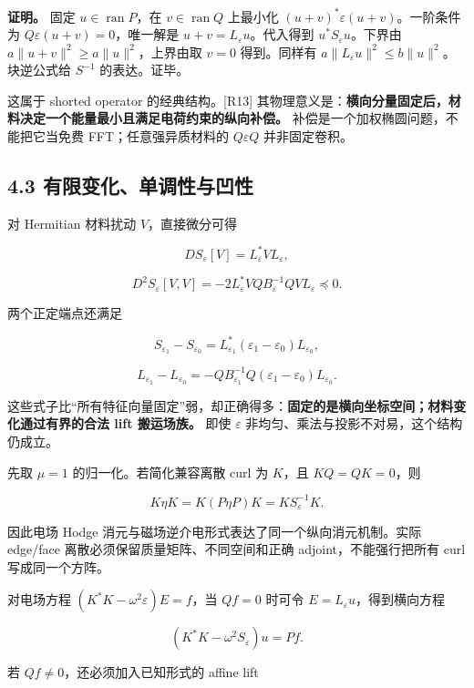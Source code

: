 \documentclass[11pt,a4paper]{article}
\begin{document}
\textbf{证明。} 固定 \(u\in\operatorname{ran}P\)，在
\(v\in\operatorname{ran}Q\) 上最小化
\((u+v)^*\varepsilon(u+v)\)。一阶条件为
\(Q\varepsilon(u+v)=0\)，唯一解是 \(u+v=L_\varepsilon u\)。代入得到
\(u^*S_\varepsilon u\)。下界由 \(a\|u+v\|^2\ge a\|u\|^2\)，上界由取
\(v=0\) 得到。同样有 \(a\|L_\varepsilon u\|^2\le b\|u\|^2\)。块逆公式给
\(S^{-1}\) 的表达。证毕。

这属于 shorted operator 的经典结构。{[}R13{]}
其物理意义是：\textbf{横向分量固定后，材料决定一个能量最小且满足电荷约束的纵向补偿。}
补偿是一个加权椭圆问题，不能把它当免费 FFT；任意强异质材料的
\(Q\varepsilon Q\) 并非固定卷积。

\hypertarget{ux6709ux9650ux53d8ux5316ux5355ux8c03ux6027ux4e0eux51f9ux6027}{%
\subsection{4.3
有限变化、单调性与凹性}\label{ux6709ux9650ux53d8ux5316ux5355ux8c03ux6027ux4e0eux51f9ux6027}}

对 Hermitian 材料扰动 \(V\)，直接微分可得

\[
DS_\varepsilon[V]=L_\varepsilon^*V L_\varepsilon,
\]

\[
D^2S_\varepsilon[V,V]
=-2L_\varepsilon^*VQ B_\varepsilon^{-1}QV L_\varepsilon\preceq0.
\]

两个正定端点还满足

\[
S_{\varepsilon_1}-S_{\varepsilon_0}
=L_{\varepsilon_1}^*(\varepsilon_1-\varepsilon_0)L_{\varepsilon_0},
\]

\[
L_{\varepsilon_1}-L_{\varepsilon_0}
=-QB_{\varepsilon_1}^{-1}Q
(\varepsilon_1-\varepsilon_0)L_{\varepsilon_0}.
\]

这些式子比``所有特征向量固定''弱，却正确得多：\textbf{固定的是横向坐标空间；材料变化通过有界的合法
lift 搬运场族。} 即使 \(\varepsilon\)
非均匀、乘法与投影不对易，这个结构仍成立。

先取 \(\mu=1\) 的归一化。若简化兼容离散 curl 为 \(K\)，且
\(KQ=QK=0\)，则

\[
K\eta K=K(P\eta P)K=KS_\varepsilon^{-1}K.
\]

因此电场 Hodge 消元与磁场逆介电形式表达了同一个纵向消元机制。实际
edge/face 离散必须保留质量矩阵、不同空间和正确 adjoint，不能强行把所有
curl 写成同一个方阵。

对电场方程 \((K^*K-\omega^2\varepsilon)E=f\)，当 \(Qf=0\) 时可令
\(E=L_\varepsilon u\)，得到横向方程

\[
(K^*K-\omega^2S_\varepsilon)u=Pf.
\]

若 \(Qf\ne0\)，还必须加入已知形式的 affine lift
\end{document}
